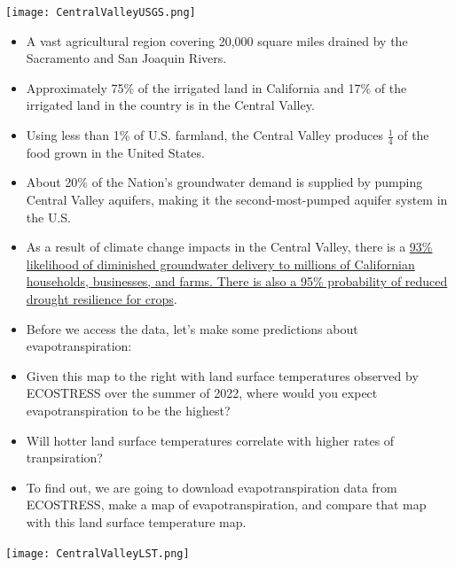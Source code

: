 \documentclass[oneside,a4paper,11pt,explicit]{book}
\begin{document}
\begin{tcolorbox}[colback=yellow!5!white,colframe=IceCreamLeaf,title=\textbf{California's Central Valley}]
	\begin{multicols}{2}

	\centerline{\texttt{[image: CentralValleyUSGS.png]}}
	\columnbreak
		\begin{itemize}
			\item A vast agricultural region covering 20,000 square miles drained by the Sacramento and San Joaquin Rivers.
			\item Approximately 75\% of the irrigated land in California and 17\% of the irrigated land in the country is in the Central Valley.
			\item Using less than 1\% of U.S. farmland, the Central Valley produces $\frac{1}{4}$ of the food grown in the United States.
			\item About 20\% of the Nation's groundwater demand is supplied by pumping Central Valley aquifers, making it the second-most-pumped aquifer system in the U.S.
			\item As a result of climate change impacts in the Central Valley, there is a \href{https://www.energy.ca.gov/sites/default/files/2019-12/Water_CCCA4-EXT-2018-001_ada.pdf}{93\% likelihood of diminished groundwater delivery to millions of Californian households, businesses, and farms. There is also a 95\% probability of reduced drought resilience for crops}. 
		\end{itemize}
	\end{multicols}
\end{tcolorbox}

\begin{tcolorbox}[colback=yellow!5!white,colframe=IceCreamLeaf,title=\textbf{Hypotheses}]
	\begin{multicols}{2}

		\vspace*{.25em}

		\begin{itemize}
			\item Before we access the data, let's make some predictions about evapotranspiration:
			\item Given this map to the right with land surface temperatures observed by ECOSTRESS over the summer of 2022, where would you expect evapotranspiration to be the highest?
			\item Will hotter land surface temperatures correlate with higher rates of tranpsiration?
			\item To find out, we are going to download evapotranspiration data from ECOSTRESS, make a map of evapotranspiration, and compare that map with this land surface temperature map.
		\end{itemize}

		\columnbreak	

		\centerline{\texttt{[image: CentralValleyLST.png]}}
		
	\end{multicols}
\end{tcolorbox}
\end{document}
